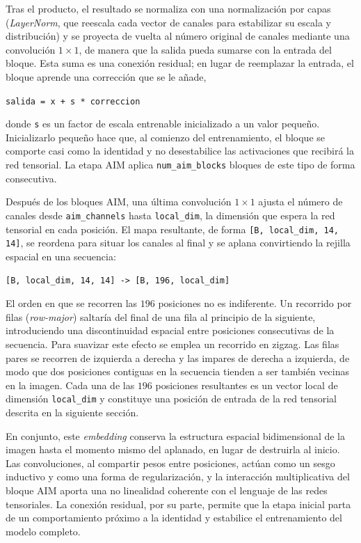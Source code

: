 Tras el producto, el resultado se normaliza con una normalización por capas (\textit{LayerNorm}, que reescala cada vector de canales para estabilizar su escala y distribución) y se proyecta de vuelta al número original de canales mediante una convolución $1\times1$, de manera que la salida pueda sumarse con la entrada del bloque. Esta suma es una conexión residual; en lugar de reemplazar la entrada, el bloque aprende una corrección que se le añade,

\begin{center}
\texttt{salida = x + s * correccion}
\end{center}

donde \texttt{s} es un factor de escala entrenable inicializado a un valor pequeño. Inicializarlo pequeño hace que, al comienzo del entrenamiento, el bloque se comporte casi como la identidad y no desestabilice las activaciones que recibirá la red tensorial. La etapa AIM aplica \texttt{num\_aim\_blocks} bloques de este tipo de forma consecutiva.

Después de los bloques AIM, una última convolución $1\times1$ ajusta el número de canales desde \texttt{aim\_channels} hasta \texttt{local\_dim}, la dimensión que espera la red tensorial en cada posición. El mapa resultante, de forma \texttt{[B, local\_dim, 14, 14]}, se reordena para situar los canales al final y se aplana convirtiendo la rejilla espacial en una secuencia:

\begin{center}
\texttt{[B, local\_dim, 14, 14] -> [B, 196, local\_dim]}
\end{center}

El orden en que se recorren las $196$ posiciones no es indiferente. Un recorrido por filas (\textit{row-major}) saltaría del final de una fila al principio de la siguiente, introduciendo una discontinuidad espacial entre posiciones consecutivas de la secuencia. Para suavizar este efecto se emplea un recorrido en zigzag. Las filas pares se recorren de izquierda a derecha y las impares de derecha a izquierda, de modo que dos posiciones contiguas en la secuencia tienden a ser también vecinas en la imagen. Cada una de las $196$ posiciones resultantes es un vector local de dimensión \texttt{local\_dim} y constituye una posición de entrada de la red tensorial descrita en la siguiente sección.

\medskip

En conjunto, este \textit{embedding} conserva la estructura espacial bidimensional de la imagen hasta el momento mismo del aplanado, en lugar de destruirla al inicio. Las convoluciones, al compartir pesos entre posiciones, actúan como un sesgo inductivo y como una forma de regularización, y la interacción multiplicativa del bloque AIM aporta una no linealidad coherente con el lenguaje de las redes tensoriales. La conexión residual, por su parte, permite que la etapa inicial parta de un comportamiento próximo a la identidad y estabilice el entrenamiento del modelo completo.

